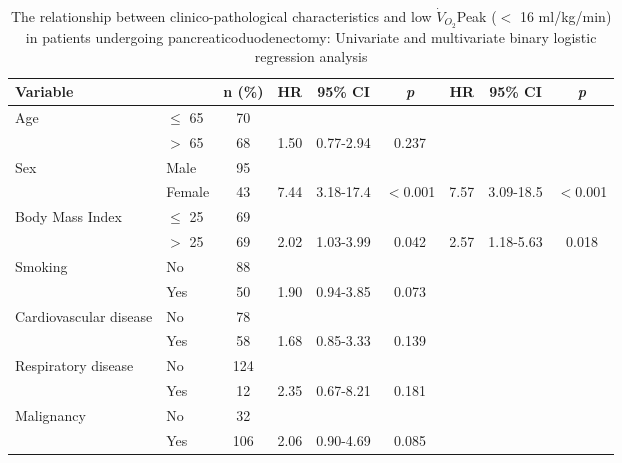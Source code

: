 \begin{sidewaystable}[p]
	\caption{The relationship between clinico-pathological characteristics and low $\dot{V}_{O_2}$Peak ($<$ 16 ml/kg/min) in patients undergoing pancreaticoduodenectomy: Univariate and multivariate binary logistic regression analysis}
	\label{table:cpet_oj_peak_regression}
	\setlength{\tabcolsep}{9pt} %
	\centering
	\begin{tabular}{|l l c| c c c| c c c|}
		\hline
		Variable                &           & n (\%) & HR   & 95\% CI   & \textit{p} & HR   & 95\% CI   & \textit{p} \\ \hline
		Age                     & $\leq$ 65 & 70     &      &           &            &      &           &  \\
		                        & $>$ 65    & 68     & 1.50 & 0.77-2.94 & 0.237      &      &           &  \\
		Sex                     & Male      & 95     &      &           &            &      &           &  \\
		                        & Female    & 43     & 7.44 & 3.18-17.4 & $<$0.001   & 7.57 & 3.09-18.5 & $<$0.001   \\
		Body Mass Index         & $\leq$ 25 & 69     &      &           &            &      &           &  \\
		                        & $>$ 25    & 69     & 2.02 & 1.03-3.99 & 0.042      & 2.57 & 1.18-5.63 & 0.018      \\
		Smoking                 & No        & 88     &      &           &            &      &           &  \\
		                        & Yes       & 50     & 1.90 & 0.94-3.85 & 0.073      &      &           &  \\
		Cardiovascular disease  & No        & 78     &      &           &            &      &           &  \\
		                        & Yes       & 58     & 1.68 & 0.85-3.33 & 0.139      &      &           &  \\
		Respiratory disease     & No        & 124    &      &           &            &      &           &  \\
		                        & Yes       & 12     & 2.35 & 0.67-8.21 & 0.181      &      &           &  \\
		Malignancy              & No        & 32     &      &           &            &      &           &  \\
		                        & Yes       & 106    & 2.06 & 0.90-4.69 & 0.085      &      &           &  \\

\end{tabular}
\end{sidewaystable}

